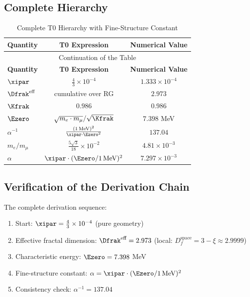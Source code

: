 	\subsection{Complete Hierarchy}
	
	\begin{longtable}{lcc}
		\caption{Complete T0 Hierarchy with Fine-Structure Constant} \\
		\toprule
		\textbf{Quantity} & \textbf{T0 Expression} & \textbf{Numerical Value} \\
		\midrule
		\endfirsthead
		\multicolumn{3}{c}{Continuation of the Table} \\
		\toprule
		\textbf{Quantity} & \textbf{T0 Expression} & \textbf{Numerical Value} \\
		\midrule
		\endhead
		\bottomrule
		\endlastfoot
		$\xipar$ & $\frac{4}{3} \times 10^{-4}$ & $1.333 \times 10^{-4}$ \\
		$\Dfrak^{\text{eff}}$ & cumulative over RG & $2.973$ \\
		$\Kfrak$ & $0.986$ & $0.986$ \\
		$\Ezero$ & $\sqrt{m_e \cdot m_\mu}/\sqrt{\Kfrak}$ & $7.398$ MeV \\
		$\alpha^{-1}$ & $\frac{(1\,\text{MeV})^2}{\xipar \cdot \Ezero^2}$ & $137.04$ \\
		$m_e/m_\mu$ & $\frac{5\sqrt{3}}{18} \times 10^{-2}$ & $4.81 \times 10^{-3}$ \\
		$\alpha$ & $\xipar \cdot (\Ezero/1\,\text{MeV})^2$ & $7.297 \times 10^{-3}$ \\
	\end{longtable}
\normalsize
	
	\subsection{Verification of the Derivation Chain}
	
	The complete derivation sequence:
	\begin{enumerate}
		\item Start: $\xipar = \frac{4}{3} \times 10^{-4}$ (pure geometry)
		\item Effective fractal dimension: $\Dfrak^{\text{eff}} = 2.973$ (local: $D_f^{\text{space}} = 3 - \xi \approx 2.9999$)
		\item Characteristic energy: $\Ezero = 7.398$ MeV
		\item Fine-structure constant: $\alpha = \xipar \cdot (\Ezero/1\,\text{MeV})^2$
		\item Consistency check: $\alpha^{-1} = 137.04$ \checkmark
	\end{enumerate}
	
